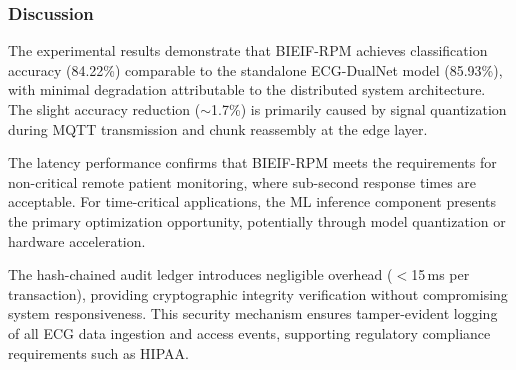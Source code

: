 \subsubsection{Discussion}

The experimental results demonstrate that BIEIF-RPM achieves classification accuracy (84.22\%) comparable to the standalone ECG-DualNet model (85.93\%), with minimal degradation attributable to the distributed system architecture. The slight accuracy reduction ($\sim$1.7\%) is primarily caused by signal quantization during MQTT transmission and chunk reassembly at the edge layer.

The latency performance confirms that BIEIF-RPM meets the requirements for non-critical remote patient monitoring, where sub-second response times are acceptable. For time-critical applications, the ML inference component presents the primary optimization opportunity, potentially through model quantization or hardware acceleration.

The hash-chained audit ledger introduces negligible overhead ($<$15\,ms per transaction), providing cryptographic integrity verification without compromising system responsiveness. This security mechanism ensures tamper-evident logging of all ECG data ingestion and access events, supporting regulatory compliance requirements such as HIPAA.

%
%
%
